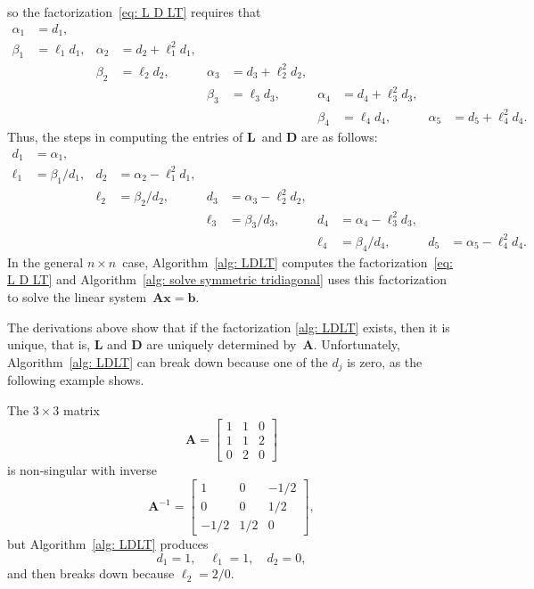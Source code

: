 so the factorization~\eqref{eq: L D LT} requires that
\begin{align*}
     \alpha_1&=d_1,      &        &                 &&&&&&\\
      \beta_1&=\ell_1d_1,&\alpha_2&=d_2+\ell_1^2d_1,&&&&&&\\
    &&\beta_2&=\ell_2d_2,&\alpha_3&=d_3+\ell_2^2d_2,&&&&\\
  &&&&\beta_3&=\ell_3d_3,&\alpha_4&=d_4+\ell_3^2d_3,&&\\
&&&&&&\beta_4&=\ell_4d_4,&\alpha_5&=d_5+\ell_4^2d_4.
\end{align*}
Thus, the steps in computing the entries of $\boldsymbol{L}$~and 
$\boldsymbol{D}$ are as follows:
\begin{align*}
         d_1&=\alpha_1,   &   &                      &&&&&&\\
      \ell_1&=\beta_1/d_1,&d_2&=\alpha_2-\ell_1^2d_1,&&&&&&\\
    &&\ell_2&=\beta_2/d_2,&d_3&=\alpha_3-\ell_2^2d_2,&&&&\\
  &&&&\ell_3&=\beta_3/d_3,&d_4&=\alpha_4-\ell_3^2d_3,&&\\
&&&&&&\ell_4&=\beta_4/d_4,&d_5&=\alpha_5-\ell_4^2d_4.
\end{align*}
In the general $n\times n$~case,
Algorithm~\ref{alg: LDLT} computes the factorization~\eqref{eq: L D LT}
and Algorithm~\ref{alg: solve symmetric tridiagonal} 
uses this factorization to solve the linear 
system~$\boldsymbol{A}\boldsymbol{x}=\boldsymbol{b}$. 

The derivations above show that if the factorization \eqref{alg: LDLT} exists,
then it is unique, that is, $\boldsymbol{L}$ and $\boldsymbol{D}$ are uniquely 
determined by~$\boldsymbol{A}$.  Unfortunately,
Algorithm~\ref{alg: LDLT} can break down because one of the $d_j$ is zero, as 
the following example shows.

\begin{example}
The $3\times3$ matrix
\[
\boldsymbol{A}=\begin{bmatrix}1&1&0\\1&1&2\\ 0&2&0 \end{bmatrix}
\]
is non-singular with inverse
\[
\boldsymbol{A}^{-1}=\begin{bmatrix}1&0&-1/2\\ 0&0&1/2\\ -1/2&1/2&0\end{bmatrix},
\]
but Algorithm~\ref{alg: LDLT} produces
\[
d_1=1,\quad \ell_1=1,\quad d_2=0,
\]
and then breaks down because $\ell_2=2/0$.
\end{example}

